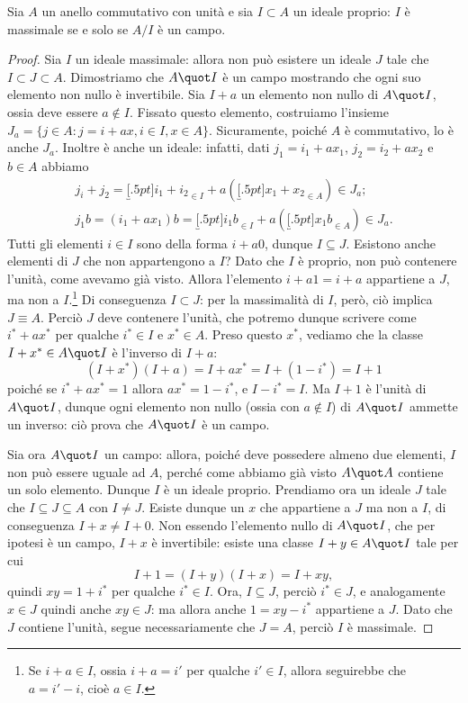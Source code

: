 \begin{teorema} \label{t:ideale-massimale-quoziente-campo}
	Sia $A$ un anello commutativo con unità e sia $I\subset A$ un ideale proprio: $I$ è massimale se e solo se $A/I$ è un campo.
\end{teorema}
\begin{proof}
	Sia $I$ un ideale massimale: allora non può esistere un ideale $J$ tale che $I\subset J\subset A$.
	Dimostriamo che $A\quot I$ è un campo mostrando che ogni suo elemento non nullo è invertibile.
	Sia $I+a$ un elemento non nullo di $A\quot I$, ossia deve essere $a\notin I$.
	Fissato questo elemento, costruiamo l'insieme $J_a=\{j\in A\colon j=i+ax, i\in I, x\in A\}$.
	Sicuramente, poich\'e $A$ è commutativo, lo è anche $J_a$.
	Inoltre è anche un ideale: infatti, dati $j_1=i_1+ax_1$, $j_2=i_2+ax_2$ e $b\in A$ abbiamo
	\begin{equation}
		\begin{gathered}
			j_i+j_2=\underbracket[.5pt]{i_1+i_2}_{\in I}+a(\underbracket[.5pt]{x_1+x_2}_{\in A})\in J_a;\\
			j_1b=(i_1+ax_1)b=\underbracket[.5pt]{i_1b}_{\in I}+a(\underbracket[.5pt]{x_1b}_{\in A})\in J_a.
		\end{gathered}
	\end{equation}
	Tutti gli elementi $i\in I$ sono della forma $i+a0$, dunque $I\subseteq J$.
	Esistono anche elementi di $J$ che non appartengono a $I$?
	Dato che $I$ è proprio, non può contenere l'unità, come avevamo già visto.
	Allora l'elemento $i+a1=i+a$ appartiene a $J$, ma non a $I$.\footnote{Se $i+a\in I$, ossia $i+a=i'$ per qualche $i'\in I$, allora seguirebbe che $a=i'-i$, cioè $a\in I$.}
	Di conseguenza $I\subset J$: per la massimalità di $I$, però, ciò implica $J\equiv A$.
	Perciò $J$ deve contenere l'unità, che potremo dunque scrivere come $i^*+ax^*$ per qualche $i^*\in I$ e $x^*\in A$.
	Preso questo $x^*$, vediamo che la classe $I+x^*\in A\quot I$ è l'inverso di $I+a$:
	\begin{equation}
		(I+x^*)(I+a)=I+ax^*=I+(1-i^*)=I+1
	\end{equation}
	poich\'e se $i^*+ax^*=1$ allora $ax^*=1-i^*$, e $I-i^*= I$.
	Ma $I+1$ è l'unità di $A\quot I$, dunque ogni elemento non nullo (ossia con $a\notin I$) di $A\quot I$ ammette un inverso: ciò prova che $A\quot I$ è un campo.

	Sia ora $A\quot I$ un campo: allora, poich\'e deve possedere almeno due elementi, $I$ non può essere uguale ad $A$, perch\'e come abbiamo già visto $A\quot A$ contiene un solo elemento.
	Dunque $I$ è un ideale proprio.
	Prendiamo ora un ideale $J$ tale che $I\subseteq J\subseteq A$ con $I\ne J$.
	Esiste dunque un $x$ che appartiene a $J$ ma non a $I$, di conseguenza $I+x\ne I+0$.
	Non essendo l'elemento nullo di $A\quot I$, che per ipotesi è un campo, $I+x$ è invertibile: esiste una classe $I+y\in A\quot I$ tale per cui
	\begin{equation*}
		I+1=(I+y)(I+x)=I+xy,
	\end{equation*}
	quindi $xy=1+i^*$ per qualche $i^*\in I$.
	Ora, $I\subseteq J$, perciò $i^*\in J$, e analogamente $x\in J$ quindi anche $xy\in J$: ma allora anche $1=xy-i^*$ appartiene a $J$.
	Dato che $J$ contiene l'unità, segue necessariamente che $J=A$, perciò $I$ è massimale.
\end{proof}
